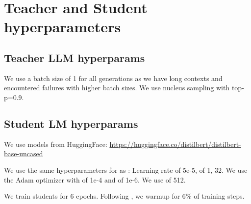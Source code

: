 \section{Teacher and Student hyperparameters}
\label{sec:hyperparams}


\subsection{Teacher LLM hyperparams}

We use a batch size of 1 for all generations as we have long contexts and encountered failures with higher batch sizes. We use nucleus sampling with top-p=0.9.

\subsection{Student LM hyperparams}
We use \DistilBERT{} models from HuggingFace: \url{https://huggingface.co/distilbert/distilbert-base-uncased}

We use the same hyperparameters for \DistilBERT{} as \citep{yu2023large}: Learning rate of 5e-5,  of 1,  32. We use the Adam optimizer with  of 1e-4 and  of 1e-6. We use  of 512.  


We train students for 6 epochs. Following \citep{yu2023large}, we  warmup for 6\% of training steps.

